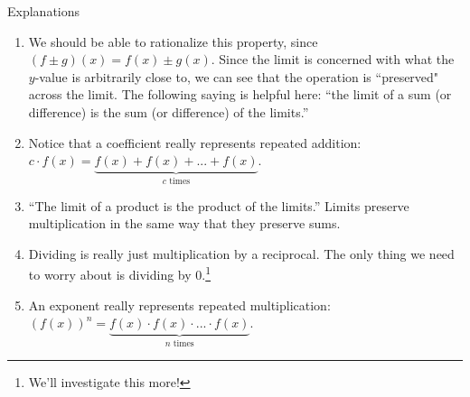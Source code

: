 \begin{note}{Explanations}\hspace{1cm}
  \begin{enumerate}
    \item We should be able to rationalize this property, since $(f\pm g)(x)= f(x)\pm g(x)$.
    Since the limit is concerned with what the $y$-value is arbitrarily close to, we can see that the operation is ``preserved" across the limit.
    The following saying is helpful here: ``the limit of a sum (or difference) is the sum (or difference) of the limits.''
    \item Notice that a coefficient really represents repeated addition: $c\cdot f(x) = \underbrace{f(x) + f(x) + ...+ f(x)}_{c \text{ times}}$.
    \item ``The limit of a product is the product of the limits.''
    Limits preserve multiplication in the same way that they preserve sums.
    \item Dividing is really just multiplication by a reciprocal.
    The only thing we need to worry about is dividing by 0.\footnote{We'll investigate this more!}
    \item An exponent really represents repeated multiplication: $(f(x))^n = \underbrace{f(x) \cdot f(x) \cdot ... \cdot f(x)}_{n \text{ times}}$.
  \end{enumerate}
\end{note}

